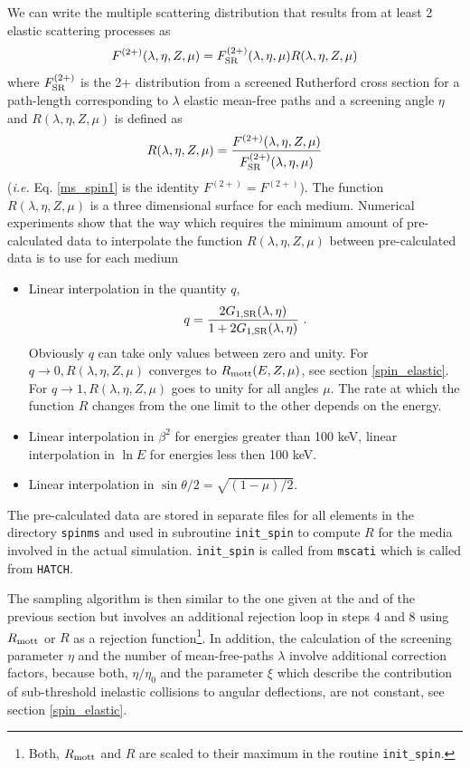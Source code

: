 We can write the multiple scattering distribution 
that results from at least 2 elastic scattering processes as 
\begin{equation}
\label{ms_spin1}
F^{(2+)}(\lambda,\eta,Z,\mu) = F^{(2+)}_{\rm SR}(\lambda,\eta,\mu) 
R(\lambda,\eta,Z,\mu)
\end{equation}
where $F^{(2+)}_{\rm SR}$ is the 2+ distribution from a 
screened Rutherford cross section for a path-length corresponding 
to $\lambda$ elastic mean-free paths and a screening angle $\eta$ 
and $R(\lambda,\eta,Z,\mu)$ is defined as 
\begin{equation}
 R(\lambda,\eta,Z,\mu) = {F^{(2+)}(\lambda,\eta,Z,\mu) \over 
F^{(2+)}_{\rm SR}(\lambda,\eta,\mu)}
\end{equation}
({\em i.e.} Eq. \eqref{ms_spin1} is the identity $F^{(2+)}=F^{(2+)}$).
The function $R(\lambda,\eta,Z,\mu)$ is a three dimensional 
surface for each medium. 
Numerical experiments show that the way which requires the minimum 
amount of pre-calculated data to interpolate 
the function $R(\lambda,\eta,Z,\mu)$ between pre-calculated 
data is to use for each medium
\begin{itemize}
\item
Linear interpolation in the quantity $q$,
\begin{equation}
q = {2 G_{1,{\rm SR}}(\lambda,\eta) \over 1 + 2 G_{1,{\rm SR}}(\lambda,\eta)}~.
\end{equation}
Obviously $q$ can take only values between zero and unity. For 
$q \to 0, R(\lambda,\eta,Z,\mu)$ converges to $R_{\rm mott}(E,Z,\mu)$, 
see section \ref{spin_elastic}. For $q \to 1, R(\lambda,\eta,Z,\mu)$  
goes to unity for all angles $\mu$. The rate at which the function 
$R$ changes from the one limit to the other depends on the energy.
\item
Linear interpolation in $\beta^2$ for energies greater than 
100 keV, linear interpolation in $\ln E$ for energies less
then 100 keV. 
\item
Linear interpolation in $\sin \theta/2 = \sqrt{(1-\mu)/2}$.
\end{itemize}
The pre-calculated data are stored in separate files for 
all elements in the directory {\tt spinms} and used 
in subroutine {\tt init\_spin} to compute $R$ for 
the media involved in the actual simulation. {\tt init\_spin} 
is called from {\tt mscati} which is called from {\tt HATCH}.  

The sampling algorithm is then similar to the one given at the 
and of the previous section but involves an additional rejection 
loop in steps 4 and 8 using $R_{\rm mott}$ or $R$ as a 
rejection function\footnote{Both, $R_{\rm mott}$ and $R$ are 
scaled to their maximum in the routine {\tt init\_spin}.}. 
In addition, the calculation of the screening parameter 
$\eta$ and the number of mean-free-paths $\lambda$ involve 
additional correction factors, because both, $\eta/\eta_0$ and 
the parameter $\xi$ which describe the contribution 
of sub-threshold inelastic collisions to angular deflections,  
are not constant, see section \ref{spin_elastic}.


